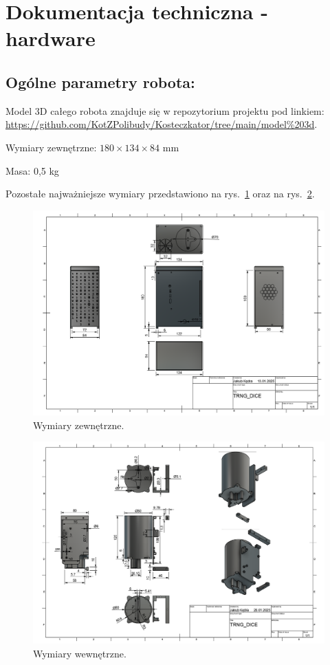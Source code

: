 \section{Dokumentacja techniczna - hardware}\label{sec:dokumentacja-techniczna}

\subsection{Ogólne parametry robota:}
Model 3D całego robota znajduje się w repozytorium projektu pod linkiem: \url{https://github.com/KotZPolibudy/Kosteczkator/tree/main/model%203d}.

Wymiary zewnętrzne: $180 \times 134 \times 84$ mm

Masa: 0,5 kg

Pozostałe najważniejsze wymiary przedstawiono na rys.~\ref{fig:wymiary} oraz na rys.~\ref{fig:wymiary_wew}.
\begin{figure}[H]
    \centering
    \includegraphics[width=0.95\linewidth]{chapters/03-praca-wlasna/figures/wym_zwe.png}
    \caption{\label{fig:wymiary}Wymiary zewnętrzne.}
\end{figure}
\begin{figure}[H]
    \centering
    \includegraphics[width=0.95\linewidth]{chapters/03-praca-wlasna/figures/wym_wew.png}
    \caption{\label{fig:wymiary_wew}Wymiary wewnętrzne.}
\end{figure}

